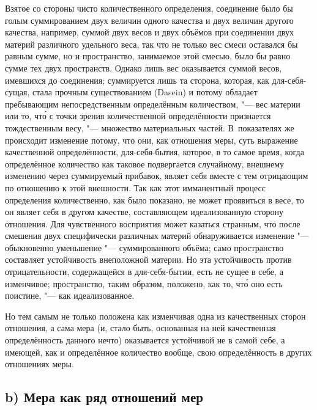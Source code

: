 Взятое со стороны чисто количественного определения, соединение было бы голым
суммированием двух величин одного качества и двух величин другого качества,
например, суммой двух весов и двух объёмов при соединении двух материй
различного удельного веса, так что не только вес смеси оставался бы равным
сумме, но и пространство, занимаемое этой смесью, было бы равно сумме тех двух
пространств. Однако лишь вес оказывается суммой весов, имевшихся до соединения;
суммируется лишь та сторона, которая, как для-себя-сущая, стала прочным
существованием (Dasein) и потому обладает пребывающим непосредственным
определённым количеством, "--- вес материи или то, чт\'{о} с точки зрения
количественной определённости признается тождественным весу, "--- множество
материальных частей. В~показателях же происходит изменение потому, что они, как
отношения меры, суть выражение качественной определённости, для-себя-бытия,
которое, в то самое время, когда определённое количество как таковое
подвергается случайному, внешнему изменению через суммируемый прибавок, являет
себя вместе с тем отрицающим по отношению к этой внешности. Так как этот
имманентный процесс определения количественно, как было показано, не может
проявиться в весе, то он являет себя в другом качестве, составляющем
идеализованную сторону отношения. Для чувственного восприятия может казаться
странным, что после смешения двух специфически различных материй обнаруживается
изменение "--- обыкновенно уменьшение "--- суммированного объёма; само
пространство составляет устойчивость внеположной материи. Но эта устойчивость
против отрицательности, содержащейся в для-себя-бытии, есть не сущее в себе, а
изменчивое; пространство, таким образом, положено, как то, чт\'{о} оно есть
поистине, "--- как идеализованное.

Но тем самым не только положена как изменчивая одна из качественных сторон
отношения, а сама мера (и, стало быть, основанная на ней качественная
определённость данного нечто) оказывается устойчивой не в самой себе, а
имеющей, как и определённое количество вообще, свою определённость в других
отношениях меры.

\subsection[b) Мера как ряд отношений мер]{b) Мера как ряд отношений мер}

